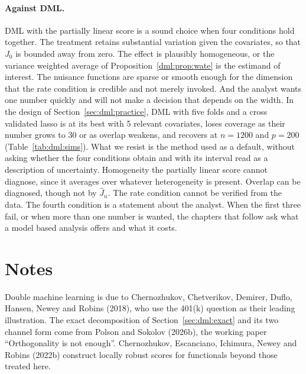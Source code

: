 \paragraph{Against DML.} DML with the partially linear score is a sound choice when four conditions hold together. The treatment retains substantial variation given the covariates, so that $J_0$ is bounded away from zero. The effect is plausibly homogeneous, or the variance weighted average of Proposition~\ref{dml:prop:wate} is the estimand of interest. The nuisance functions are sparse or smooth enough for the dimension that the rate condition is credible and not merely invoked. And the analyst wants one number quickly and will not make a decision that depends on the width. In the design of Section~\ref{sec:dml:practice}, DML with five folds and a cross validated lasso is at its best with 5 relevant covariates, loses coverage as their number grows to 30 or as overlap weakens, and recovers at $n = 1200$ and $p = 200$ (Table~\ref{tab:dml:sims}). What we resist is the method used as a default, without asking whether the four conditions obtain and with its interval read as a description of uncertainty. Homogeneity the partially linear score cannot diagnose, since it averages over whatever heterogeneity is present. Overlap can be diagnosed, though not by $\hat J_n$. The rate condition cannot be verified from the data. The fourth condition is a statement about the analyst. When the first three fail, or when more than one number is wanted, the chapters that follow ask what a model based analysis offers and what it costs.

\section*{Notes}

Double machine learning is due to Chernozhukov, Chetverikov, Demirer, Duflo, Hansen, Newey and Robins (2018), who use the 401(k) question as their leading illustration. The exact decomposition of Section~\ref{sec:dml:exact} and its two channel form come from Polson and Sokolov (2026b), the working paper ``Orthogonality is not enough''. Chernozhukov, Escanciano, Ichimura, Newey and Robins (2022b) construct locally robust scores for functionals beyond those treated here.

